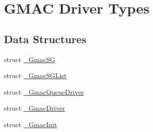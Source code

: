 \hypertarget{group__gmacd__types}{}\section{G\+M\+AC Driver Types}
\label{group__gmacd__types}
\subsection*{Data Structures}
\begin{DoxyCompactItemize}
\item 
struct \mbox{\hyperlink{struct__GmacSG}{\+\_\+\+Gmac\+SG}}
\item 
struct \mbox{\hyperlink{struct__GmacSGList}{\+\_\+\+Gmac\+S\+G\+List}}
\item 
struct \mbox{\hyperlink{struct__GmacQueueDriver}{\+\_\+\+Gmac\+Queue\+Driver}}
\item 
struct \mbox{\hyperlink{struct__GmacDriver}{\+\_\+\+Gmac\+Driver}}
\item 
struct \mbox{\hyperlink{struct__GmacInit}{\+\_\+\+Gmac\+Init}}
\end{DoxyCompactItemize}
